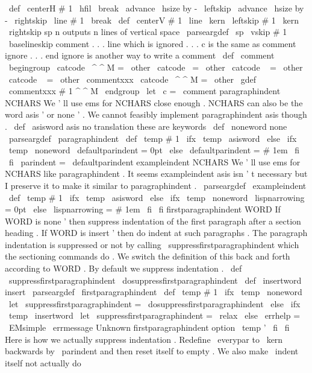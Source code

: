 \
def
\
centerH
#
1
{
%
{
%
\
hfil
\
break
\
advance
\
hsize
by
-
\
leftskip
\
advance
\
hsize
by
-
\
rightskip
\
line
{
#
1
}
%
\
break
}
%
}
\
def
\
centerV
#
1
{
\
line
{
\
kern
\
leftskip
#
1
\
kern
\
rightskip
}
}
%
sp
n
outputs
n
lines
of
vertical
space
\
parseargdef
\
sp
{
\
vskip
#
1
\
baselineskip
}
%
comment
.
.
.
line
which
is
ignored
.
.
.
%
c
is
the
same
as
comment
%
ignore
.
.
.
end
ignore
is
another
way
to
write
a
comment
\
def
\
comment
{
\
begingroup
\
catcode
\
^
^
M
=
\
other
%
\
catcode
\
=
\
other
\
catcode
\
{
=
\
other
\
catcode
\
}
=
\
other
%
\
commentxxx
}
{
\
catcode
\
^
^
M
=
\
other
\
gdef
\
commentxxx
#
1
^
^
M
{
\
endgroup
}
}
\
let
\
c
=
\
comment
%
paragraphindent
NCHARS
%
We
'
ll
use
ems
for
NCHARS
close
enough
.
%
NCHARS
can
also
be
the
word
asis
'
or
none
'
.
%
We
cannot
feasibly
implement
paragraphindent
asis
though
.
%
\
def
\
asisword
{
asis
}
%
no
translation
these
are
keywords
\
def
\
noneword
{
none
}
%
\
parseargdef
\
paragraphindent
{
%
\
def
\
temp
{
#
1
}
%
\
ifx
\
temp
\
asisword
\
else
\
ifx
\
temp
\
noneword
\
defaultparindent
=
0pt
\
else
\
defaultparindent
=
#
1em
\
fi
\
fi
\
parindent
=
\
defaultparindent
}
%
exampleindent
NCHARS
%
We
'
ll
use
ems
for
NCHARS
like
paragraphindent
.
%
It
seems
exampleindent
asis
isn
'
t
necessary
but
%
I
preserve
it
to
make
it
similar
to
paragraphindent
.
\
parseargdef
\
exampleindent
{
%
\
def
\
temp
{
#
1
}
%
\
ifx
\
temp
\
asisword
\
else
\
ifx
\
temp
\
noneword
\
lispnarrowing
=
0pt
\
else
\
lispnarrowing
=
#
1em
\
fi
\
fi
}
%
firstparagraphindent
WORD
%
If
WORD
is
none
'
then
suppress
indentation
of
the
first
paragraph
%
after
a
section
heading
.
If
WORD
is
insert
'
then
do
indent
at
such
%
paragraphs
.
%
%
The
paragraph
indentation
is
suppressed
or
not
by
calling
%
\
suppressfirstparagraphindent
which
the
sectioning
commands
do
.
%
We
switch
the
definition
of
this
back
and
forth
according
to
WORD
.
%
By
default
we
suppress
indentation
.
%
\
def
\
suppressfirstparagraphindent
{
\
dosuppressfirstparagraphindent
}
\
def
\
insertword
{
insert
}
%
\
parseargdef
\
firstparagraphindent
{
%
\
def
\
temp
{
#
1
}
%
\
ifx
\
temp
\
noneword
\
let
\
suppressfirstparagraphindent
=
\
dosuppressfirstparagraphindent
\
else
\
ifx
\
temp
\
insertword
\
let
\
suppressfirstparagraphindent
=
\
relax
\
else
\
errhelp
=
\
EMsimple
\
errmessage
{
Unknown
firstparagraphindent
option
\
temp
'
}
%
\
fi
\
fi
}
%
Here
is
how
we
actually
suppress
indentation
.
Redefine
\
everypar
to
%
\
kern
backwards
by
\
parindent
and
then
reset
itself
to
empty
.
%
%
We
also
make
\
indent
itself
not
actually
do
